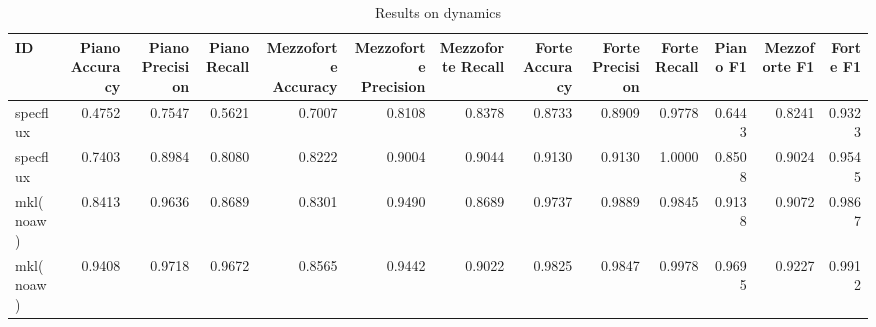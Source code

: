 \begin{table}
\centering
\caption{Results on dynamics}
\label{tb:dynsol}
\begin{tabular}{lrrrrrrrrrrrr}
\toprule
        ID &  Piano Accuracy &  Piano Precision &  Piano Recall &  Mezzoforte Accuracy &  Mezzoforte Precision &  Mezzoforte Recall &  Forte Accuracy &  Forte Precision &  Forte Recall &  Piano F1 &  Mezzoforte F1 &  Forte F1 \\
\midrule
  specflux &          0.4752 &           0.7547 &        0.5621 &               0.7007 &                0.8108 &             0.8378 &          0.8733 &           0.8909 &        0.9778 &    0.6443 &         0.8241 &    0.9323 \\
  specflux &          0.7403 &           0.8984 &        0.8080 &               0.8222 &                0.9004 &             0.9044 &          0.9130 &           0.9130 &        1.0000 &    0.8508 &         0.9024 &    0.9545 \\
 mkl(noaw) &          0.8413 &           0.9636 &        0.8689 &               0.8301 &                0.9490 &             0.8689 &          0.9737 &           0.9889 &        0.9845 &    0.9138 &         0.9072 &    0.9867 \\
 mkl(noaw) &          0.9408 &           0.9718 &        0.9672 &               0.8565 &                0.9442 &             0.9022 &          0.9825 &           0.9847 &        0.9978 &    0.9695 &         0.9227 &    0.9912 \\
\bottomrule
\end{tabular}
\end{table}
